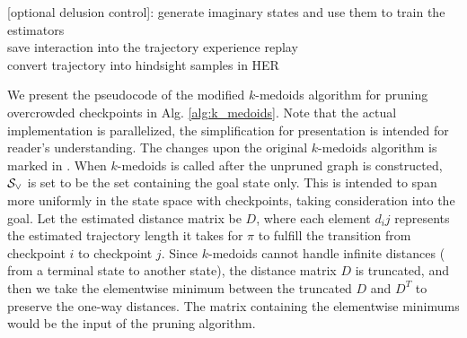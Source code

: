 \begin{algorithm*}[htbp]
{{{            [optional delusion control]: generate imaginary states and use them to train the estimators\\
        }
        save interaction into the trajectory experience replay\\
    }
    convert trajectory into hindsight samples in HER \\
}
\end{algorithm*}

We present the pseudocode of the modified $k$-medoids algorithm for pruning overcrowded checkpoints in Alg. \ref{alg:k_medoids}. Note that the actual implementation is parallelized, the simplification for presentation is intended for reader's understanding. The changes upon the original $k$-medoids algorithm is marked in . When $k$-medoids is called after the unpruned graph is constructed, $\mathcal{S}_\vee$ is set to be the set containing the goal state only. This is intended to span more uniformly in the state space with checkpoints, taking consideration into the goal. Let the estimated distance matrix be $D$, where each element $d_ij$ represents the estimated trajectory length it takes for $\pi$ to fulfill the transition from checkpoint $i$ to checkpoint $j$. Since $k$-medoids cannot handle infinite distances (\eg{} from a terminal state to another state), the distance matrix $D$ is truncated, and then we take the elementwise minimum between the truncated $D$ and $D^T$ to preserve the one-way distances. The matrix containing the elementwise minimums would be the input of the pruning algorithm.

